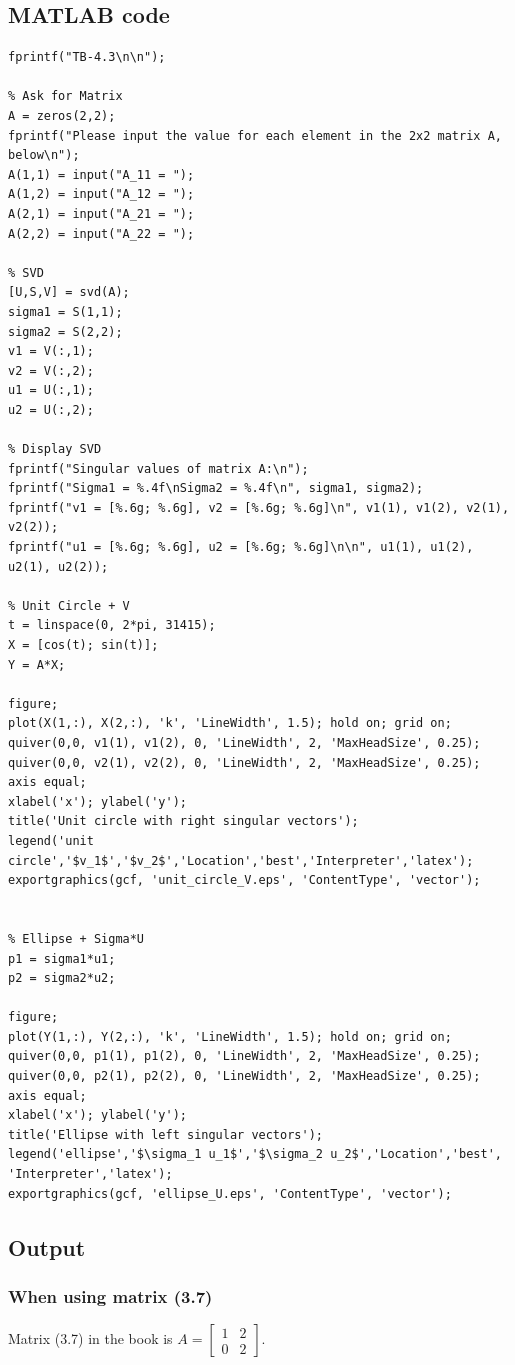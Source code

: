 \documentclass{article}
\begin{document}
\subsection*{MATLAB code}
\begin{lstlisting}[caption={My MATLAB code for solving this question.}]
%% tb-4.3
fprintf("TB-4.3\n\n");

% Ask for Matrix
A = zeros(2,2);
fprintf("Please input the value for each element in the 2x2 matrix A, below\n");
A(1,1) = input("A_11 = ");
A(1,2) = input("A_12 = ");
A(2,1) = input("A_21 = ");
A(2,2) = input("A_22 = ");

% SVD
[U,S,V] = svd(A);
sigma1 = S(1,1);
sigma2 = S(2,2);
v1 = V(:,1);
v2 = V(:,2);
u1 = U(:,1);
u2 = U(:,2);

% Display SVD
fprintf("Singular values of matrix A:\n");
fprintf("Sigma1 = %.4f\nSigma2 = %.4f\n", sigma1, sigma2);
fprintf("v1 = [%.6g; %.6g], v2 = [%.6g; %.6g]\n", v1(1), v1(2), v2(1), v2(2));
fprintf("u1 = [%.6g; %.6g], u2 = [%.6g; %.6g]\n\n", u1(1), u1(2), u2(1), u2(2));

% Unit Circle + V
t = linspace(0, 2*pi, 31415);
X = [cos(t); sin(t)];
Y = A*X;

figure;
plot(X(1,:), X(2,:), 'k', 'LineWidth', 1.5); hold on; grid on;
quiver(0,0, v1(1), v1(2), 0, 'LineWidth', 2, 'MaxHeadSize', 0.25);
quiver(0,0, v2(1), v2(2), 0, 'LineWidth', 2, 'MaxHeadSize', 0.25);
axis equal;
xlabel('x'); ylabel('y');
title('Unit circle with right singular vectors');
legend('unit circle','$v_1$','$v_2$','Location','best','Interpreter','latex');
exportgraphics(gcf, 'unit_circle_V.eps', 'ContentType', 'vector');


% Ellipse + Sigma*U
p1 = sigma1*u1;
p2 = sigma2*u2;

figure;
plot(Y(1,:), Y(2,:), 'k', 'LineWidth', 1.5); hold on; grid on;
quiver(0,0, p1(1), p1(2), 0, 'LineWidth', 2, 'MaxHeadSize', 0.25);
quiver(0,0, p2(1), p2(2), 0, 'LineWidth', 2, 'MaxHeadSize', 0.25);
axis equal;
xlabel('x'); ylabel('y');
title('Ellipse with left singular vectors');
legend('ellipse','$\sigma_1 u_1$','$\sigma_2 u_2$','Location','best',
'Interpreter','latex');
exportgraphics(gcf, 'ellipse_U.eps', 'ContentType', 'vector');
\end{lstlisting}

\subsection*{Output}
\subsubsection{When using matrix (3.7)}
Matrix (3.7) in the book is $A =\begin{bmatrix} 1 & 2 \\ 0 & 2 \end{bmatrix}$.
\end{document}
